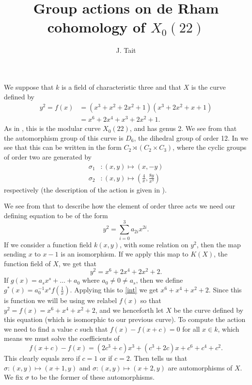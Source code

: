 \documentclass[draft, 11pt]{article} %
\title{Group actions on de Rham cohomology of $X_0(22)$}
\author{J. Tait}
\theoremstyle{plain}
\theoremstyle{remark}
\begin{document}
\maketitle

We suppose that $k$ is a field of characteristic three and that $X$ is the curve defined by
\begin{align*}
y^2 = f(x)  & = (x^3 + x^2 + 2x^2 + 1)(x^3 + 2x^2 + x + 1)\\
& = x^6 + 2x^4 + x^3 + 2x^2 + 1.
\end{align*}
As in \cite[Table 2]{automorphismshyperellipticmodular}, this is the modular curve $X_0(22)$, and has genus 2.
We see from \cite[Table 1]{automorphismshyperellipticmodular} that the automorphism group of this curve is $D_6$, the dihedral group of order 12.
In \cite[\S 3.3]{automorphismshyperellipticmodular} we see that this can be written in the form $C_2 \rtimes (C_2 \times C_3)$, where the cyclic groups of order two are generated by
\begin{align*}
\sigma_1 & \colon (x,y) \mapsto (x,-y) \\
\sigma_2 & \colon (x,y) \mapsto \left( \frac{4}{x}, \frac{8y}{x^3} \right)
\end{align*}
respectively (the description of the action is given in \cite[Table 1]{automorphismshyperellipticmodular}).

We see from \cite[\S 3.3]{automorphismshyperellipticmodular} that to describe how the element of order three acts we need our defining equation to be of the form
\[
y^2 = \sum_{i=0}^3 a_{2i}x^{2i}.
\]
If we consider a function field $k(x,y)$, with some relation on $y^2$, then the map sending $x$ to $x-1$ is an isomorphism.
If we apply this map to $K(X)$, the function field of $X$, we get that
\begin{equation}\label{int}
y^2 = x^6 + 2x^4 + 2x^2 + 2.
\end{equation}
If $g(x) = a_sx^s + \ldots + a_0$ where $a_0 \neq 0 \neq a_s$, then we define $g^*(x) = a_0^{-1}x^sf\left( \frac{1}{x} \right)$.
Applying this to \eqref{int} we get $x^6 + x^4 + x^2 + 2$.
Since this is function we will be using we relabel $f(x)$ so that $y^2 = f(x) = x^6 + x^4 + x^2 + 2$, and we henceforth let $X$ be the curve defined by this equation (which is isomorphic to our previous curve).
To compute the action we need to find a value $c$ such that $f(x) - f(x+c) = 0$ for all $x \in k$, which means we must solve the coefficients of
\[
f(x+c) - f(x) = (2c^3+c)x^3 + (c^3 + 2c)x + c^6 + c^4 + c^2.
\]
This clearly equals zero if $c=1$ or if $c=2$.
Then \cite[\S 3.3]{automorphismshyperellipticmodular} tells us that $\sigma \colon (x,y) \mapsto (x+1, y)$ and $\sigma \colon (x,y) \mapsto (x+2,y)$ are automorphisms of $X$.
We fix $\sigma$ to be the former of these automorphisms.
\end{document}
